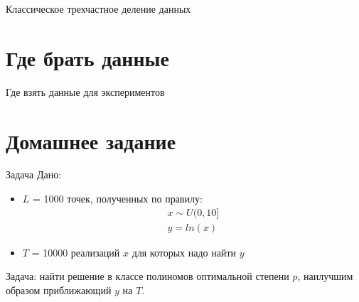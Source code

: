 \documentclass[14pt, fleqn, xcolor={dvipsnames, table}]{beamer}
\begin{document}
\begin{frame}{Классическое трехчастное деление данных}
\end{frame}

\section{Где брать данные}
\begin{frame}{Где взять данные для экспериментов}
\end{frame}

\section{Домашнее задание}
\begin{frame}{Задача}
Дано:
\begin{itemize}
  \item $L$ = 1000 точек, полученных по правилу:
$$\begin{array}{l}
x \sim U (0,10] \\
y = ln(x)
\end{array}$$
  \item $T$ = 10000 реализаций $x$ для которых надо найти $y$
\end{itemize}
Задача: найти решение в классе полиномов оптимальной степени $p$, наилучшим образом приближающий $y$ на $T$.

\end{frame}
\end{document}

